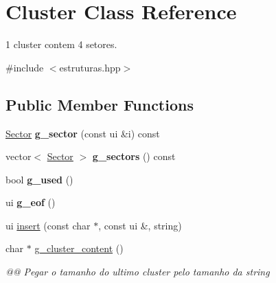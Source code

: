 \hypertarget{classCluster}{}\section{Cluster Class Reference}
\label{classCluster}


1 cluster contem 4 setores.  




{\ttfamily \#include $<$estruturas.\+hpp$>$}

\subsection*{Public Member Functions}
\begin{DoxyCompactItemize}
\item 
\hyperlink{classSector}{Sector} {\bfseries g\+\_\+sector} (const ui \&i) const \hypertarget{classCluster_a26a447ffce23a83058de596992e037fa}{}\label{classCluster_a26a447ffce23a83058de596992e037fa}

\item 
vector$<$ \hyperlink{classSector}{Sector} $>$ {\bfseries g\+\_\+sectors} () const \hypertarget{classCluster_aaac56dea9a3a88e348ba0b52685634d0}{}\label{classCluster_aaac56dea9a3a88e348ba0b52685634d0}

\item 
bool {\bfseries g\+\_\+used} ()\hypertarget{classCluster_a18e5235a2fcea5312e20c2b6ab8948e8}{}\label{classCluster_a18e5235a2fcea5312e20c2b6ab8948e8}

\item 
ui {\bfseries g\+\_\+eof} ()\hypertarget{classCluster_ae61b236a751342d0ff0c40f736ca433a}{}\label{classCluster_ae61b236a751342d0ff0c40f736ca433a}

\item 
ui \hyperlink{classCluster_a75218b99ef972794e1571f6937fc09e2}{insert} (const char $\ast$, const ui \&, string)
\item 
char $\ast$ \hyperlink{classCluster_aa0e49fff4e5b177c71c618508b3534ef}{g\+\_\+cluster\+\_\+content} ()\hypertarget{classCluster_aa0e49fff4e5b177c71c618508b3534ef}{}\label{classCluster_aa0e49fff4e5b177c71c618508b3534ef}

\begin{DoxyCompactList}\small\item\em @@ Pegar o tamanho do ultimo cluster pelo tamanho da string \end{DoxyCompactList}\end{DoxyCompactItemize}


